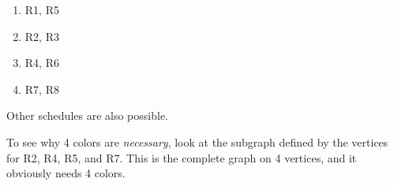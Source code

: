 \documentclass[12pt,twoside]{article}
\begin{document}
\begin{problem}{20}
{\begin{enumerate}
\item R1, R5

\item R2, R3

\item R4, R6

\item R7, R8

\end{enumerate}
Other schedules are also possible.

To see why 4 colors are \emph{necessary}, look at the subgraph defined
by the vertices for R2, R4, R5, and R7.  This is the complete graph on 4
vertices, and it obviously needs 4 colors.
}

\eparts

\end{problem}
\end{document}
